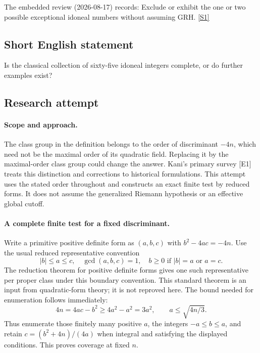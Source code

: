 \documentclass[11pt,a4paper]{article}
\newcommand{\sref}[2]{\hyperlink{source:#1:#2}{[S#2]}}
\begin{document}
The embedded review (2026-08-17) records: Exclude or exhibit the one or two possible exceptional idoneal numbers without assuming GRH. \sref{statement}{1}

\subsection{Short English statement}

Is the classical collection of sixty-five idoneal integers complete, or do further examples exist?

\subsection{Research attempt}

\paragraph{Scope and approach.}
The class group in the definition belongs to the order of discriminant
$-4n$, which need not be the maximal order of its quadratic field.
Replacing it by the maximal-order class group could change the answer.
Kani's primary survey [E1] treats this distinction and corrections to
historical formulations. This attempt uses the stated order throughout
and constructs an exact finite test by reduced forms. It does not assume
the generalized Riemann hypothesis or an effective global cutoff.

\paragraph{A complete finite test for a fixed discriminant.}
Write a primitive positive definite form as $(a,b,c)$ with
$b^2-4ac=-4n$. Use the usual reduced representative convention
\[
 |b|\le a\le c,\quad \gcd(a,b,c)=1,
 \quad b\ge0\text{ if }|b|=a\text{ or }a=c.
\]
The reduction theorem for positive definite forms gives one such
representative per proper class under this boundary convention. This
standard theorem is an input from quadratic-form theory; it is not
reproved here. The bound needed for enumeration follows immediately:
\[
 4n=4ac-b^2\ge4a^2-a^2=3a^2,
 \qquad a\le\sqrt{4n/3}.
\]
Thus enumerate those finitely many positive $a$, the integers
$-a\le b\le a$, and retain $c=(b^2+4n)/(4a)$ when integral and
satisfying the displayed conditions. This proves coverage at fixed $n$.
\end{document}
